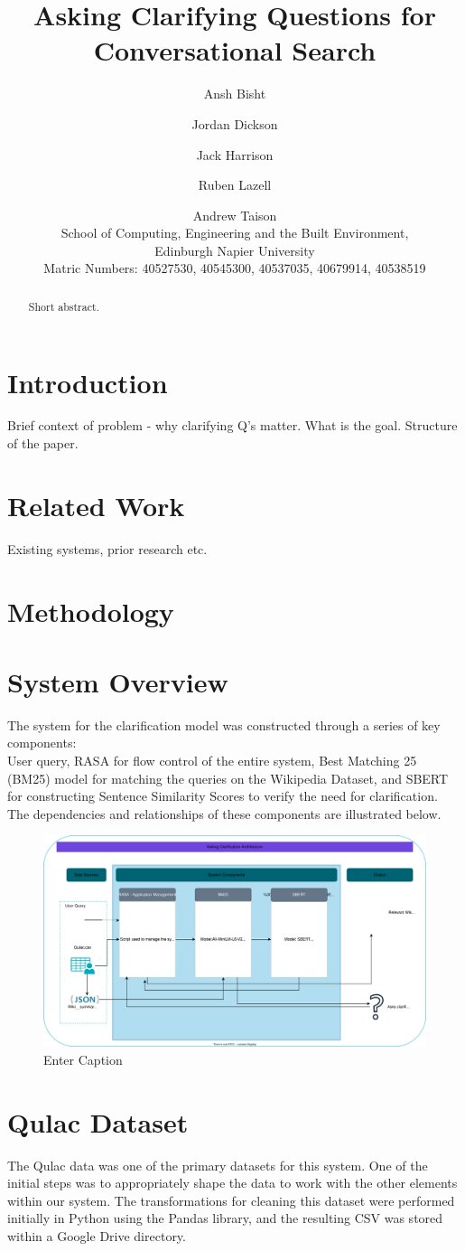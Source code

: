 \documentclass[11pt]{article}
\title{Asking Clarifying Questions for Conversational Search}
\author{
  Ansh Bisht \and
  Jordan Dickson \and
  Jack Harrison \and
  Ruben Lazell \and
  Andrew Taison  \\
  School of Computing, Engineering and the Built Environment, \\
  Edinburgh Napier University \\
  Matric Numbers: 40527530, 40545300, 40537035, 40679914, 40538519
}
\begin{document}
\maketitle
\begin{abstract}
Short abstract.
\end{abstract}


\section{Introduction}
Brief context of problem - why clarifying Q's matter.
What is the goal.
Structure of the paper.

\section{Related Work}
Existing systems, prior research etc.

\section{Methodology}



\section{System Overview}
The system for the clarification model was constructed through a series of key components: \\User query, RASA for flow control of the entire system, Best Matching 25 (BM25) model for matching the queries on the Wikipedia Dataset, and SBERT for constructing Sentence Similarity Scores to verify the need for clarification. The dependencies and relationships of these components are illustrated below.

\begin{figure}
    \centering
    \includegraphics[width=0.5\linewidth]{System Diagram.drawio.svg}
    \caption{Enter Caption}
    \label{fig:enter-label}
\end{figure}

\section{Qulac Dataset}
The Qulac data was one of the primary datasets for this system. One of the initial steps was to appropriately shape the data to work with the other elements within our system. The transformations for cleaning this dataset were performed initially in Python using the Pandas library, and the resulting CSV was stored within a Google Drive directory.
\end{document}
